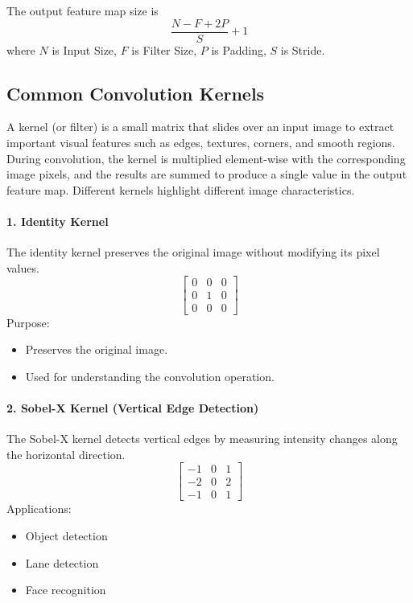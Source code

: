 \documentclass[11pt]{article}
\begin{document}
The output feature map size is
\[
\frac{N-F+2P}{S}+1
\]
where $N$ is Input Size, $F$ is Filter Size, $P$ is Padding, $S$ is Stride.

\vspace{4mm}
\subsection*{Common Convolution Kernels}

A kernel (or filter) is a small matrix that slides over an input image to extract important visual features such as edges, textures, corners, and smooth regions. During convolution, the kernel is multiplied element-wise with the corresponding image pixels, and the results are summed to produce a single value in the output feature map. Different kernels highlight different image characteristics.

\vspace{3mm}
\paragraph{1. Identity Kernel}
The identity kernel preserves the original image without modifying its pixel values.
\[
\begin{bmatrix} 0 & 0 & 0 \\ 0 & 1 & 0 \\ 0 & 0 & 0 \end{bmatrix}
\]
Purpose:
\begin{itemize}
\item Preserves the original image.
\item Used for understanding the convolution operation.
\end{itemize}

\vspace{3mm}
\paragraph{2. Sobel-X Kernel (Vertical Edge Detection)}
The Sobel-X kernel detects vertical edges by measuring intensity changes along the horizontal direction.
\[
\begin{bmatrix} -1 & 0 & 1 \\ -2 & 0 & 2 \\ -1 & 0 & 1 \end{bmatrix}
\]
Applications:
\begin{itemize}
\item Object detection
\item Lane detection
\item Face recognition
\end{itemize}
\end{document}
